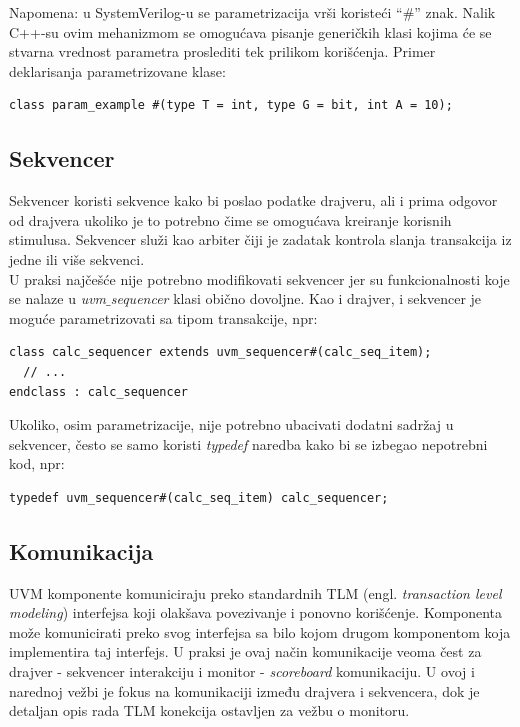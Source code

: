 Napomena: u SystemVerilog-u se parametrizacija vrši koristeći ``\(\#\)'' znak.
Nalik C++-su ovim mehanizmom se omogućava pisanje generičkih klasi kojima će se
stvarna vrednost parametra proslediti tek prilikom korišćenja. Primer
deklarisanja parametrizovane klase:

\begin{lstlisting}
class param_example #(type T = int, type G = bit, int A = 10);
\end{lstlisting}


\subsection{Sekvencer}

Sekvencer koristi sekvence kako bi poslao podatke drajveru, ali i prima odgovor
od drajvera ukoliko je to potrebno čime se omogućava kreiranje korisnih
stimulusa. Sekvencer služi kao arbiter čiji je zadatak kontrola slanja
transakcija iz jedne ili više sekvenci.\\

U praksi najčešće nije potrebno modifikovati sekvencer jer su funkcionalnosti
koje se nalaze u \emph{uvm\(\_\)sequencer} klasi obično dovoljne. Kao i drajver,
i sekvencer je moguće parametrizovati sa tipom transakcije, npr:

\begin{lstlisting}
class calc_sequencer extends uvm_sequencer#(calc_seq_item);
  // ...
endclass : calc_sequencer
\end{lstlisting}

Ukoliko, osim parametrizacije, nije potrebno ubacivati dodatni sadržaj u
sekvencer, često se samo koristi \emph{typedef} naredba kako bi se izbegao
nepotrebni kod, npr:

\begin{lstlisting}
typedef uvm_sequencer#(calc_seq_item) calc_sequencer;
\end{lstlisting}


\subsection{Komunikacija}

UVM komponente komuniciraju preko standardnih TLM (engl. \emph{transaction level
  modeling}) interfejsa koji olakšava povezivanje i ponovno korišćenje.
Komponenta može komunicirati preko svog interfejsa sa bilo kojom drugom
komponentom koja implementira taj interfejs. U praksi je ovaj način komunikacije
veoma čest za drajver - sekvencer interakciju i monitor - \emph{scoreboard}
komunikaciju. U ovoj i narednoj vežbi je fokus na komunikaciji između drajvera
i sekvencera, dok je detaljan opis rada TLM konekcija ostavljen za vežbu o
monitoru.\\

